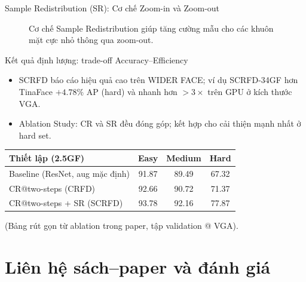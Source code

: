 \documentclass[aspectratio=169,11pt]{beamer}
\begin{document}
\begin{frame}{Sample Redistribution (SR): Cơ chế Zoom-in và Zoom-out}
\begin{figure}
    \caption{Cơ chế Sample Redistribution giúp tăng cường mẫu cho các khuôn mặt cực nhỏ thông qua zoom-out.}
  \end{figure}
\end{frame}

\begin{frame}{Kết quả định lượng: trade-off Accuracy--Efficiency}
  \begin{itemize}
    \setlength{\itemsep}{6pt}
    \item SCRFD báo cáo hiệu quả cao trên WIDER FACE; ví dụ SCRFD-34GF hơn TinaFace \(+4.78\%\) AP (hard) và nhanh hơn \(>3\times\) trên GPU ở kích thước VGA.\ \cite{guo2022scrfd,yang2016widerface}
    \item Ablation Study: CR và SR đều đóng góp; kết hợp cho cải thiện mạnh nhất ở hard set.\ \cite{guo2022scrfd}
  \end{itemize}
  \vspace{6pt}
  {\centering
    \small
    \begin{tabular}{@{}lccc@{}}
      \toprule
      \textbf{Thiết lập (2.5GF)} & \textbf{Easy} & \textbf{Medium} & \textbf{Hard} \\
      \midrule
      Baseline (ResNet, aug mặc định) & 91.87 & 89.49 & 67.32 \\
      CR@two-steps (CRFD)            & 92.66 & 90.72 & 71.37 \\
      CR@two-steps + SR (SCRFD)      & 93.78 & 92.16 & 77.87 \\
      \bottomrule
    \end{tabular}
    \par\vspace{2pt}
    \parbox{\linewidth}{\centering\scriptsize (Bảng rút gọn từ ablation trong paper, tập validation @ VGA).\par}
  }
\end{frame}


\section{Liên hệ sách--paper và đánh giá}
\end{document}
